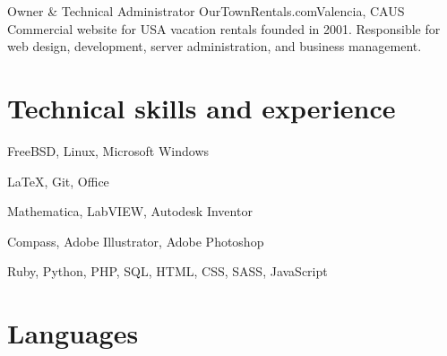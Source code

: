 \documentclass[10pt,letter]{moderncv}
\begin{document}
    {Owner \& Technical Administrator}
    {OurTownRentals.com}{Valencia, CA}{US}
    {Commercial website for USA vacation rentals founded in 2001.
      Responsible for web design, development, server administration, and business management.}

  \section{Technical skills and experience}

    {FreeBSD, Linux, Microsoft Windows}

    {\LaTeX, Git, Office}

    {Mathematica, LabVIEW, Autodesk Inventor}

    {Compass, Adobe Illustrator, Adobe Photoshop}

    {Ruby, Python, PHP, SQL, HTML, CSS, SASS, JavaScript}

  \section{Languages}

\end{document}
